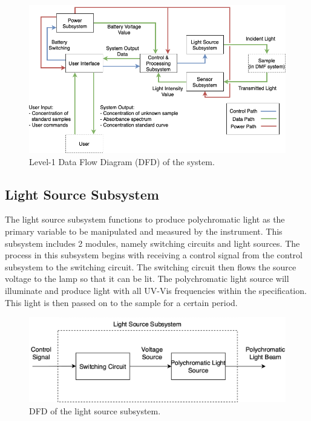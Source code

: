 \documentclass[conference]{IEEEtran}
\begin{document}
    \begin{figure}[htbp]
    \centerline{\includegraphics[scale=0.4]{system-dfd.png}}
    \caption{Level-1 Data Flow Diagram (DFD) of the system.}
    \label{system-dfd}
    \end{figure}

\subsection{Light Source Subsystem}
The light source subsystem functions to produce polychromatic light as the primary variable to be manipulated and measured by the instrument. This subsystem includes 2 modules, namely switching circuits and light sources. The process in this subsystem begins with receiving a control signal from the control subsystem to the switching circuit. The switching circuit then flows the source voltage to the lamp so that it can be lit. The polychromatic light source will illuminate and produce light with all UV-Vis frequencies within the specification. This light is then passed on to the sample for a certain period.

    \begin{figure}[htbp]
    \centerline{\includegraphics[scale=0.5]{light-source-dfd.png}}
    \caption{DFD of the light source subsystem.}
    \label{light-source-dfd}
    \end{figure}
\end{document}
